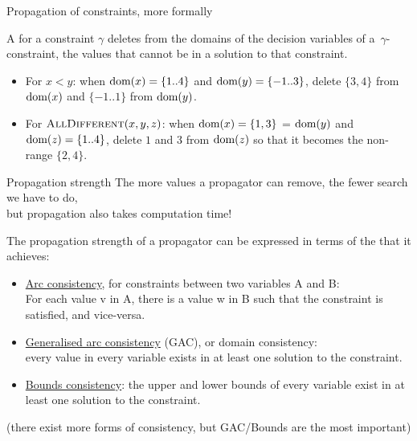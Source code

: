 \documentclass{cons-beamer}
\begin{document}
\begin{frame}{Propagation of constraints, more formally}
  \begin{definition}
    A  for a constraint $\gamma$ deletes from the
    domains of the decision
    variables of a~$\gamma$-constraint,
    the values that cannot
    be in a solution to that constraint. \\
  \end{definition}
  \begin{examples}
    \begin{itemize}
      \item For $x < y$: when $\textnormal{dom}(x) = \{1..4\}$ and $\textnormal{dom}(y) = \{-1..3\}$,
        delete $\{3, 4\}$ from $\textnormal{dom}(x)$ and
        $\{-1..1\}$ from $\textnormal{dom}(y)$.
      \item For $\textsc{AllDifferent}(x,y,z)$: when
        $\textnormal{dom}(x) = \{1,3\}$ =
        $\textnormal{dom}(y)$ and $\textnormal{dom}(z) = \{1..4\}$, delete $1$ and $3$ from
        $\textnormal{dom}(z)$ so that it becomes the non-range
        $\{2,4\}$.
    \end{itemize}
  \end{examples}
\end{frame}


\begin{frame}{Propagation strength}\label{propagator}
	The more values a propagator can remove, the fewer search we have to do, \\
	but propagation also takes computation time!
	\vfill
	\pause
	
	The propagation strength of a propagator can be expressed in terms of the  that it achieves:
	\begin{definition}
		\begin{itemize}
			\item \underline{Arc consistency}, for constraints between two variables A and B:\\
			For each value v in A, there is a value w in B such that the constraint is satisfied, and vice-versa.
			
			\item \underline{Generalised arc consistency} (GAC), or domain consistency: \\
			every value in every variable exists in at least one solution to the
			constraint.
			
			\item \underline{Bounds consistency}: the upper and lower bounds of every
			variable exist in at least one solution to the constraint.
		\end{itemize}
	\end{definition}
	\vfill
	\pause
	
	(there exist more forms of consistency, but GAC/Bounds are the most important)
\end{frame}
\end{document}
